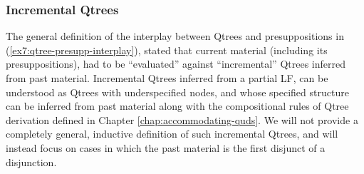 
\subsubsection{Incremental Qtrees}

The general definition of the interplay between Qtrees and presuppositions in (\ref{ex7:qtree-presupp-interplay}), stated that current material (including its presuppositions), had to be ``evaluated'' against ``incremental'' Qtrees inferred from past material. Incremental Qtrees inferred from a partial LF, can be understood as Qtrees with underspecified nodes, and whose specified structure can be inferred from past material along with the compositional rules of Qtree derivation defined in Chapter \ref{chap:accommodating-quds}. We will not provide a completely general, inductive definition of such incremental Qtrees, and will instead focus on cases in which the past material is the first disjunct of a disjunction.

